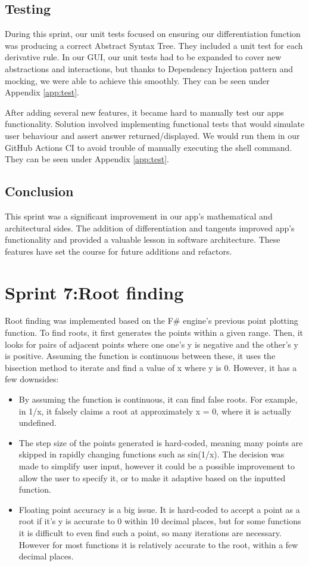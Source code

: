 \documentclass[a4paper, oneside, 11pt]{report}
\begin{document}
\subsection{Testing}
During this sprint, our unit tests focused on ensuring our differentiation function was producing a correct Abstract Syntax Tree. They included a unit test for each derivative rule. In our GUI, our unit tests had to be expanded to cover new abstractions and interactions, but thanks to Dependency Injection pattern and mocking, we were able to achieve this smoothly. They can be seen under Appendix \ref{app:test}. 

After adding several new features, it became hard to manually test our apps functionality. Solution involved implementing functional tests that would simulate user behaviour and assert answer returned/displayed. We would run them in our GitHub Actions CI to avoid trouble of manually executing the shell command. They can be seen under Appendix \ref{app:test}.

\subsection{Conclusion}
This sprint was a significant improvement in our app's mathematical and architectural sides. The addition of differentiation and tangents improved app's functionality and provided a valuable lesson in software architecture. These features have set the course for future additions and refactors.

\section{Sprint 7:Root finding}
Root finding was implemented based on the F\# engine's previous point plotting function. To find roots, it first generates the points within a given range. Then, it looks for pairs of adjacent points where one one's y is negative and the other's y is positive. Assuming the function is continuous between these, it uses the bisection method to iterate and find a value of x where y is 0. However, it has a few downsides:
\begin{itemize}
    \item By assuming the function is continuous, it can find false roots. For example, in 1/x, it falsely claims a root at approximately x = 0, where it is actually undefined.
    \item The step size of the points generated is hard-coded, meaning many points are skipped in rapidly changing functions such as sin(1/x). The decision was made to simplify user input, however it could be a possible improvement to allow the user to specify it, or to make it adaptive based on the inputted function.
    \item Floating point accuracy is a big issue. It is hard-coded to accept a point as a root if it's y is accurate to 0 within 10 decimal places, but for some functions it is difficult to even find such a point, so many iterations are necessary. However for most functions it is relatively accurate to the root, within a few decimal places.
\end{itemize}
\end{document}
